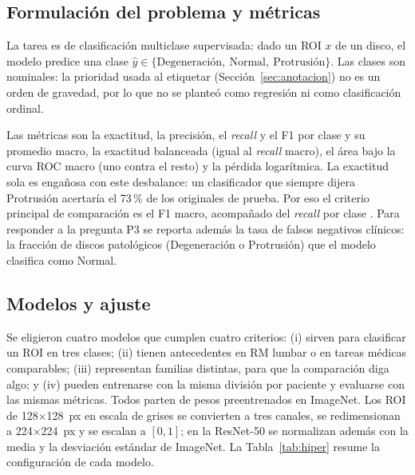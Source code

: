 
\subsection{Formulación del problema y métricas}
\label{sec:formulacion}
La tarea es de clasificación multiclase supervisada: dado un ROI $x$ de un disco, el modelo predice una clase $\hat{y}\in\{\text{Degeneración},\ \text{Normal},\ \text{Protrusión}\}$. Las clases son nominales: la prioridad usada al etiquetar (Sección~\ref{sec:anotacion}) no es un orden de gravedad, por lo que no se planteó como regresión ni como clasificación ordinal.

Las métricas son la exactitud, la precisión, el \emph{recall} y el F1 por clase y su promedio macro, la exactitud balanceada (igual al \emph{recall} macro), el área bajo la curva ROC macro (uno contra el resto) y la pérdida logarítmica. La exactitud sola es engañosa con este desbalance: un clasificador que siempre dijera Protrusión acertaría el 73\,\% de los originales de prueba. Por eso el criterio principal de comparación es el F1 macro, acompañado del \emph{recall} por clase \cite{mosquera2024}. Para responder a la pregunta P3 se reporta además la tasa de falsos negativos clínicos: la fracción de discos patológicos (Degeneración o Protrusión) que el modelo clasifica como Normal.

\subsection{Modelos y ajuste}
\label{sec:modelos}
Se eligieron cuatro modelos que cumplen cuatro criterios: (i) sirven para clasificar un ROI en tres clases; (ii) tienen antecedentes en RM lumbar o en tareas médicas comparables; (iii) representan familias distintas, para que la comparación diga algo; y (iv) pueden entrenarse con la misma división por paciente y evaluarse con las mismas métricas. Todos parten de pesos preentrenados en ImageNet. Los ROI de 128$\times$128~px en escala de grises se convierten a tres canales, se redimensionan a 224$\times$224~px y se escalan a $[0,1]$; en la ResNet-50 se normalizan además con la media y la desviación estándar de ImageNet. La Tabla~\ref{tab:hiper} resume la configuración de cada modelo.


